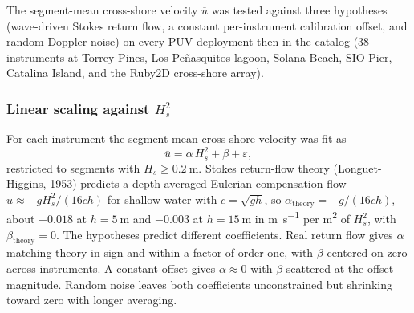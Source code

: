 
The segment-mean cross-shore velocity $\overline{u}$ was tested against three
hypotheses (wave-driven Stokes return flow, a constant per-instrument calibration
offset, and random Doppler noise) on every PUV deployment then in the catalog
(38 instruments at Torrey Pines, Los Pe\~nasquitos lagoon, Solana Beach, SIO Pier,
Catalina Island, and the Ruby2D cross-shore array).

\subsubsection{\texorpdfstring{Linear scaling against $H_s^2$}{Linear scaling against Hs squared}}
For each instrument the segment-mean cross-shore velocity was fit as
%
\begin{equation}
  \overline{u} = \alpha\, H_s^2 + \beta + \varepsilon,
  \label{eq:mean_flow_fit}
\end{equation}
%
restricted to segments with $H_s \geq \SI{0.2}{\meter}$. Stokes return-flow theory
(Longuet-Higgins, 1953) predicts a depth-averaged Eulerian compensation flow
$\overline{u} \approx -gH_s^2 / (16ch)$ for shallow water with $c = \sqrt{gh}$,
so $\alpha_\text{theory} = -g/(16ch)$, about $-0.018$ at $h = \SI{5}{\meter}$
and $-0.003$ at $h = \SI{15}{\meter}$ in \si{\meter\per\second} per
\si{\meter\squared} of $H_s^2$, with $\beta_\text{theory} = 0$. The hypotheses
predict different coefficients. Real return flow gives $\alpha$ matching theory
in sign and within a factor of order one, with $\beta$ centered on zero across
instruments. A constant offset gives $\alpha \approx 0$ with $\beta$ scattered at
the offset magnitude. Random noise leaves both coefficients unconstrained but
shrinking toward zero with longer averaging.


